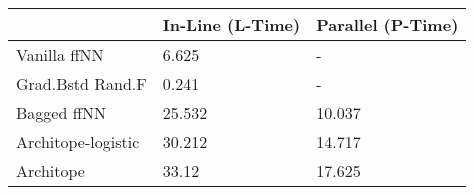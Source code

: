\begin{tabular}{lll}
\toprule
{} & In-Line (L-Time) & Parallel (P-Time) \\
\midrule
Vanilla ffNN       &            6.625 &                 - \\
Grad.Bstd Rand.F   &            0.241 &                 - \\
Bagged ffNN        &           25.532 &            10.037 \\
Architope-logistic &           30.212 &            14.717 \\
Architope          &            33.12 &            17.625 \\
\bottomrule
\end{tabular}
